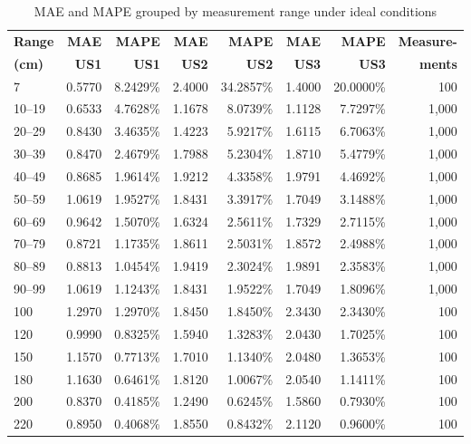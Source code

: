 \begin{table}[htbp]
\centering
\caption{MAE and MAPE grouped by measurement range under ideal conditions}
\label{tab:usrange}
\footnotesize
\setlength{\tabcolsep}{4pt}
\begin{tabular}{lrrrrrrr}
\hline
\textbf{Range} & \textbf{MAE} & \textbf{MAPE} & \textbf{MAE} & \textbf{MAPE} & \textbf{MAE} & \textbf{MAPE} & \textbf{Measure-} \\
\textbf{(cm)} & \textbf{US1} & \textbf{US1} & \textbf{US2} & \textbf{US2} & \textbf{US3} & \textbf{US3} & \textbf{ments} \\
\hline
7 & 0.5770 & 8.2429\% & 2.4000 & 34.2857\% & 1.4000 & 20.0000\% & 100 \\
10--19 & 0.6533 & 4.7628\% & 1.1678 & 8.0739\% & 1.1128 & 7.7297\% & 1,000 \\
20--29 & 0.8430 & 3.4635\% & 1.4223 & 5.9217\% & 1.6115 & 6.7063\% & 1,000 \\
30--39 & 0.8470 & 2.4679\% & 1.7988 & 5.2304\% & 1.8710 & 5.4779\% & 1,000 \\
40--49 & 0.8685 & 1.9614\% & 1.9212 & 4.3358\% & 1.9791 & 4.4692\% & 1,000 \\
50--59 & 1.0619 & 1.9527\% & 1.8431 & 3.3917\% & 1.7049 & 3.1488\% & 1,000 \\
60--69 & 0.9642 & 1.5070\% & 1.6324 & 2.5611\% & 1.7329 & 2.7115\% & 1,000 \\
70--79 & 0.8721 & 1.1735\% & 1.8611 & 2.5031\% & 1.8572 & 2.4988\% & 1,000 \\
80--89 & 0.8813 & 1.0454\% & 1.9419 & 2.3024\% & 1.9891 & 2.3583\% & 1,000 \\
90--99 & 1.0619 & 1.1243\% & 1.8431 & 1.9522\% & 1.7049 & 1.8096\% & 1,000 \\
100 & 1.2970 & 1.2970\% & 1.8450 & 1.8450\% & 2.3430 & 2.3430\% & 100 \\
120 & 0.9990 & 0.8325\% & 1.5940 & 1.3283\% & 2.0430 & 1.7025\% & 100 \\
150 & 1.1570 & 0.7713\% & 1.7010 & 1.1340\% & 2.0480 & 1.3653\% & 100 \\
180 & 1.1630 & 0.6461\% & 1.8120 & 1.0067\% & 2.0540 & 1.1411\% & 100 \\
200 & 0.8370 & 0.4185\% & 1.2490 & 0.6245\% & 1.5860 & 0.7930\% & 100 \\
220 & 0.8950 & 0.4068\% & 1.8550 & 0.8432\% & 2.1120 & 0.9600\% & 100 \\
\hline
\end{tabular}
\end{table}

